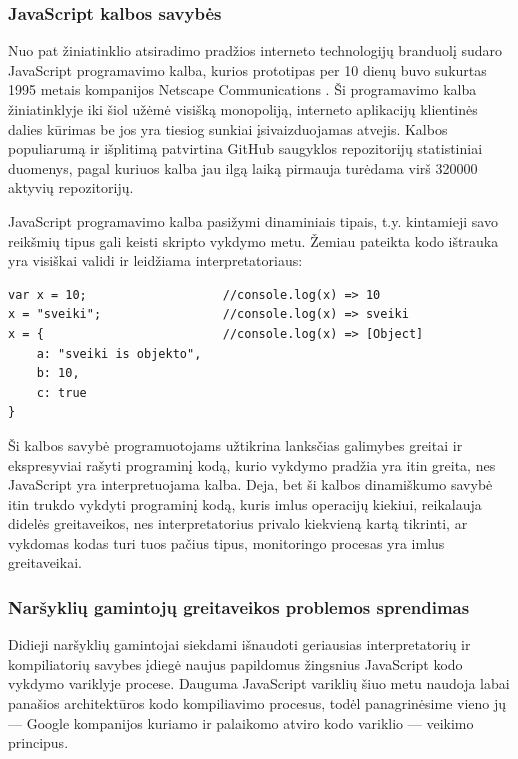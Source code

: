 \documentclass{VUMIFPSkursinis}
\begin{document}
\subsubsection{JavaScript kalbos savybės}

Nuo pat žiniatinklio atsiradimo pradžios interneto technologijų branduolį sudaro JavaScript programavimo kalba, kurios prototipas per 10 dienų buvo sukurtas 1995 metais kompanijos Netscape Communications \cite{BAH15}. Ši programavimo kalba žiniatinklyje iki šiol užėmė visišką monopoliją, interneto aplikacijų klientinės dalies kūrimas be jos yra tiesiog sunkiai įsivaizduojamas atvejis. Kalbos populiarumą ir išplitimą patvirtina GitHub saugyklos repozitorijų statistiniai duomenys, pagal kuriuos kalba jau ilgą laiką pirmauja turėdama virš 320000 aktyvių repozitorijų. \cite{GIT19}


JavaScript programavimo kalba pasižymi dinaminiais tipais, t.y. kintamieji savo reikšmių tipus gali keisti skripto vykdymo metu. Žemiau pateikta kodo ištrauka yra visiškai validi ir leidžiama interpretatoriaus:

\begin{center}
\begin{small}
\begin{verbatim}
var x = 10;                   //console.log(x) => 10
x = "sveiki";                 //console.log(x) => sveiki
x = {                         //console.log(x) => [Object]
    a: "sveiki is objekto",
    b: 10,
    c: true
}
\end{verbatim}
\end{small}
\end{center}

Ši kalbos savybė programuotojams užtikrina lanksčias galimybes greitai ir ekspresyviai rašyti programinį kodą, kurio vykdymo pradžia yra itin greita, nes JavaScript yra interpretuojama kalba. Deja, bet ši kalbos dinamiškumo savybė itin trukdo vykdyti programinį kodą, kuris imlus operacijų kiekiui, reikalauja didelės greitaveikos, nes interpretatorius privalo kiekvieną kartą tikrinti, ar vykdomas kodas turi tuos pačius tipus, monitoringo procesas yra imlus greitaveikai. \cite{LCW17}

\subsubsection{Naršyklių gamintojų greitaveikos problemos sprendimas}

Didieji naršyklių gamintojai siekdami išnaudoti geriausias interpretatorių ir kompiliatorių savybes įdiegė naujus papildomus žingsnius JavaScript kodo vykdymo variklyje procese. Dauguma JavaScript variklių šiuo metu naudoja labai panašios architektūros kodo kompiliavimo procesus, todėl panagrinėsime vieno jų — Google kompanijos kuriamo ir palaikomo atviro kodo variklio — veikimo principus.
\end{document}
